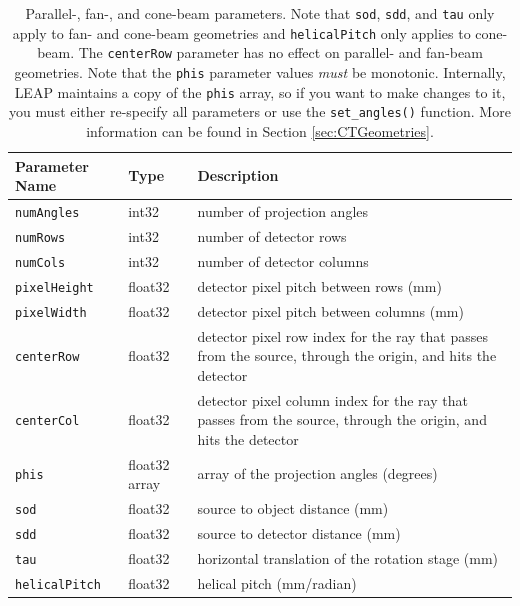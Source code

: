 \documentclass[11pt]{article}
\begin{document}
\begin{table}[h!]
\caption{Parallel-, fan-, and cone-beam parameters.  Note that \texttt{sod}, \texttt{sdd}, and \texttt{tau} only apply to fan- and cone-beam geometries and \texttt{helicalPitch} only applies to cone-beam. The \texttt{centerRow} parameter has no effect on parallel- and fan-beam geometries.  Note that the \texttt{phis} parameter values \textit{must} be monotonic.  Internally, LEAP maintains a copy of the \texttt{phis} array, so if you want to make changes to it, you must either re-specify all parameters or use the \texttt{set\_angles()} function.  More information can be found in Section \ref{sec:CTGeometries}.} \label{tab:stdGeometryParameters}
\begin{tabular}{l|l|p{9cm}}
Parameter Name & Type & Description \\
\hline
\texttt{numAngles} & int32 & number of projection angles \\
\texttt{numRows} & int32 & number of detector rows \\
\texttt{numCols} & int32 & number of detector columns \\
\texttt{pixelHeight} & float32 & detector pixel pitch between rows (mm) \\
\texttt{pixelWidth} & float32 & detector pixel pitch between columns (mm) \\
\texttt{centerRow} & float32 & detector pixel row index for the ray that passes from the source, through the origin, and hits the detector \\
\texttt{centerCol} & float32 & detector pixel column index for the ray that passes from the source, through the origin, and hits the detector \\
\texttt{phis} & float32 array & array of the projection angles (degrees) \\
\texttt{sod} & float32 & source to object distance (mm) \\
\texttt{sdd} & float32 & source to detector distance (mm) \\
\texttt{tau} & float32 & horizontal translation of the rotation stage (mm) \\
\texttt{helicalPitch} & float32 & helical pitch (mm/radian)
\end{tabular}
\end{table}
\end{document}
